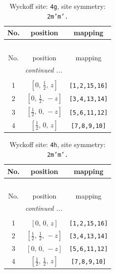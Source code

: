 \documentclass[fleqn,8pt]{jsarticle}
\begin{document}
\renewcommand{\arraystretch}{1.2}
\begin{longtable}{ccc}
\caption{Wyckoff site: {\tt 4g}, site symmetry: {\tt 2m'm'.}}
 \\
 \hline \hline
No. & position & mapping \\ \hline \endfirsthead

\multicolumn{2}{l}{\tablename\ \thetable{}} \\
 \hline \hline
No. & position & mapping \\ \hline \endhead

 \hline \hline
\multicolumn{2}{r}{\footnotesize\it continued ...} \\ \endfoot

 \hline \hline
\multicolumn{2}{r}{} \\ \endlastfoot

1 & $\left[ 0,\, \frac{1}{2},\, z \right]$ & {\tt [1,2,15,16]} \\ \hline
2 & $\left[ 0,\, \frac{1}{2},\, - z \right]$ & {\tt [3,4,13,14]} \\ \hline
3 & $\left[ \frac{1}{2},\, 0,\, - z \right]$ & {\tt [5,6,11,12]} \\ \hline
4 & $\left[ \frac{1}{2},\, 0,\, z \right]$ & {\tt [7,8,9,10]} \\
\end{longtable}
\renewcommand{\arraystretch}{1.2}
\begin{longtable}{ccc}
\caption{Wyckoff site: {\tt 4h}, site symmetry: {\tt 2m'm'.}}
 \\
 \hline \hline
No. & position & mapping \\ \hline \endfirsthead

\multicolumn{2}{l}{\tablename\ \thetable{}} \\
 \hline \hline
No. & position & mapping \\ \hline \endhead

 \hline \hline
\multicolumn{2}{r}{\footnotesize\it continued ...} \\ \endfoot

 \hline \hline
\multicolumn{2}{r}{} \\ \endlastfoot

1 & $\left[ 0,\, 0,\, z \right]$ & {\tt [1,2,15,16]} \\ \hline
2 & $\left[ \frac{1}{2},\, \frac{1}{2},\, - z \right]$ & {\tt [3,4,13,14]} \\ \hline
3 & $\left[ 0,\, 0,\, - z \right]$ & {\tt [5,6,11,12]} \\ \hline
4 & $\left[ \frac{1}{2},\, \frac{1}{2},\, z \right]$ & {\tt [7,8,9,10]} \\
\end{longtable}
\end{document}
